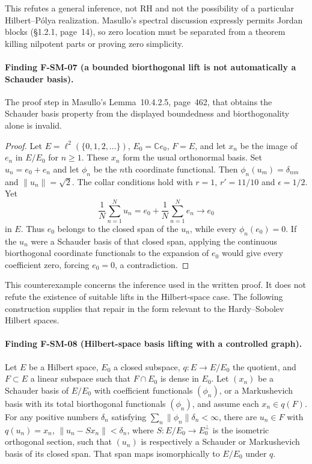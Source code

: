 This refutes a general inference, not RH and not the possibility of a
particular Hilbert--P\'olya realization.  Masullo's spectral discussion
expressly permits Jordan blocks (\S1.2.1, page~14), so zero location
must be separated from a theorem killing nilpotent parts or proving
zero simplicity.

\paragraph{Finding F-SM-07 (a bounded biorthogonal lift is not automatically
a Schauder basis).}
The proof step in Masullo's Lemma~10.4.2.5, page~462, that obtains
the Schauder basis property from the displayed boundedness and
biorthogonality alone is invalid.

\begin{proof}
Let $E=\ell^2(\{0,1,2,\ldots\})$, $E_0=\mathbb Ce_0$, $F=E$,
and let $x_n$ be the image of $e_n$ in $E/E_0$ for $n\geq1$.
These $x_n$ form the usual orthonormal basis.  Set $u_n=e_0+e_n$
and let $\phi_n$ be the $n$th coordinate functional.  Then
$\phi_n(u_m)=\delta_{nm}$ and $\|u_n\|=\sqrt2$.
The collar conditions hold with $r=1$, $r'=11/10$ and $\epsilon=1/2$.
Yet
\[
 \frac1N\sum_{n=1}^{N}u_n
   =e_0+\frac1N\sum_{n=1}^{N}e_n\longrightarrow e_0
\]
in $E$.  Thus $e_0$ belongs to the closed span of the $u_n$, while
every $\phi_n(e_0)=0$.  If the $u_n$ were a Schauder basis of that
closed span, applying the continuous biorthogonal coordinate functionals
to the expansion of $e_0$ would give every coefficient zero, forcing
$e_0=0$, a contradiction.
\end{proof}

This counterexample concerns the inference used in the written proof.
It does not refute the existence of suitable lifts in the Hilbert-space
case.  The following construction supplies that repair in the form relevant
to the Hardy--Sobolev Hilbert spaces.

\paragraph{Finding F-SM-08 (Hilbert-space basis lifting with a controlled
graph).}
Let $E$ be a Hilbert space, $E_0$ a closed subspace, $q:E\to E/E_0$ the
quotient, and $F\subset E$ a linear subspace such that $F\cap E_0$ is
dense in $E_0$.  Let $(x_n)$ be a Schauder basis of $E/E_0$ with
coefficient functionals $(\phi_n)$, or a Markushevich basis with
its total biorthogonal functionals $(\phi_n)$, and assume each
$x_n\in q(F)$.
For any positive numbers $\delta_n$ satisfying
$\sum_n\|\phi_n\|\delta_n<\infty$, there are $u_n\in F$ with
$q(u_n)=x_n$, $\|u_n-Sx_n\|<\delta_n$, where
$S:E/E_0\to E_0^\perp$ is the isometric orthogonal section, such that
$(u_n)$ is respectively a Schauder or Markushevich basis of its closed span.
That span maps
isomorphically to $E/E_0$ under $q$.


